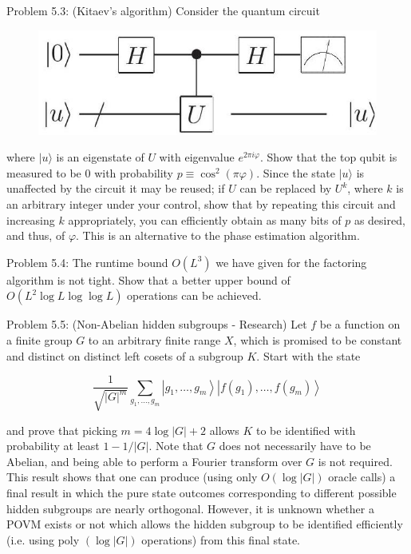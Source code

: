 Problem 5.3: (Kitaev's algorithm) Consider the quantum circuit

\begin{figure}
\centering
\includegraphics[width=0.75\linewidth]{Images/2024_05_17_6977ce60de6fd27aef98g-277}
\end{figure}

where $|u\rangle$ is an eigenstate of $U$ with eigenvalue $e^{2 \pi i \varphi}$. Show that the top qubit is\\
measured to be 0 with probability $p \equiv \cos ^{2}(\pi \varphi)$. Since the state $|u\rangle$ is unaffected by the circuit it may be reused; if $U$ can be replaced by $U^{k}$, where $k$ is an arbitrary integer under your control, show that by repeating this circuit and increasing $k$ appropriately, you can efficiently obtain as many bits of $p$ as desired, and thus, of $\varphi$. This is an alternative to the phase estimation algorithm.

Problem 5.4: The runtime bound $O\left(L^{3}\right)$ we have given for the factoring algorithm is not tight. Show that a better upper bound of $O\left(L^{2} \log L \log \log L\right)$ operations can be achieved.

Problem 5.5: (Non-Abelian hidden subgroups - Research) Let $f$ be a function on a finite group $G$ to an arbitrary finite range $X$, which is promised to be constant and distinct on distinct left cosets of a subgroup $K$. Start with the state

\begin{equation}
    \frac{1}{\sqrt{|G|^{m}}} \sum_{g_{1}, \ldots, g_{m}}\left|g_{1}, \ldots, g_{m}\right\rangle\left|f\left(g_{1}\right), \ldots, f\left(g_{m}\right)\right\rangle \tag{5.80}
\end{equation}

and prove that picking $m=4 \log |G|+2$ allows $K$ to be identified with probability at least $1-1 /|G|$. Note that $G$ does not necessarily have to be Abelian, and being able to perform a Fourier transform over $G$ is not required. This result shows that one can produce (using only $O(\log |G|)$ oracle calls) a final result in which the pure state outcomes corresponding to different possible hidden subgroups are nearly orthogonal. However, it is unknown whether a POVM exists or not which allows the hidden subgroup to be identified efficiently (i.e. using poly $(\log |G|)$ operations) from this final state.

